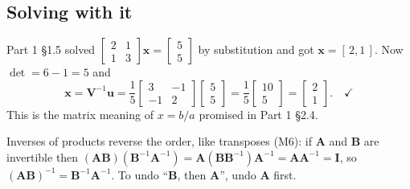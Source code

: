 \documentclass[11pt]{article}
\theoremstyle{plain}
\theoremstyle{definition}
\theoremstyle{remark}
\newcommand{\vc}[1]{\mathbf{#1}}
\newcommand{\mt}[1]{\mathbf{#1}}
\begin{document}
\subsection{Solving with it}
Part 1 \S1.5 solved
$\begin{bmatrix}2&1\\1&3\end{bmatrix}\vc{x}=\begin{bmatrix}5\\5\end{bmatrix}$ by
substitution and got $\vc{x}=[\,2,1\,]$. Now $\det=6-1=5$ and
\[
  \vc{x}=\mt{V}^{-1}\vc{u}
  =\frac15\begin{bmatrix}3&-1\\-1&2\end{bmatrix}\begin{bmatrix}5\\5\end{bmatrix}
  =\frac15\begin{bmatrix}10\\5\end{bmatrix}
  =\begin{bmatrix}2\\1\end{bmatrix}. \quad\checkmark
\]
This is the matrix meaning of $x=b/a$ promised in Part 1 \S2.4.

Inverses of products reverse the order, like transposes (M6): if $\mt{A}$ and
$\mt{B}$ are invertible then
$(\mt{A}\mt{B})(\mt{B}^{-1}\mt{A}^{-1})=\mt{A}(\mt{B}\mt{B}^{-1})\mt{A}^{-1}=\mt{A}\mt{A}^{-1}=\mt{I}$,
so $(\mt{A}\mt{B})^{-1}=\mt{B}^{-1}\mt{A}^{-1}$. To undo ``$\mt{B}$, then
$\mt{A}$'', undo $\mt{A}$ first.

\end{document}
